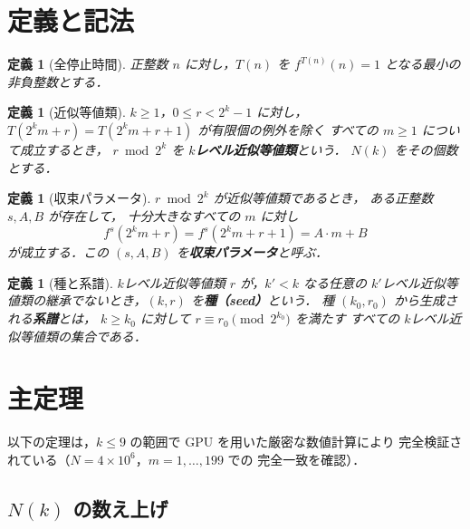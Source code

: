 \documentclass[twocolumn,a4paper,10pt]{jsarticle}
\newtheorem{definition}[theorem]{定義}
\begin{document}
\section{定義と記法}

\begin{definition}[全停止時間]
正整数 $n$ に対し，$T(n)$ を $f^{T(n)}(n) = 1$ となる最小の非負整数とする．
\end{definition}

\begin{definition}[近似等値類]
$k \geq 1$，$0 \leq r < 2^k - 1$ に対し，
$T(2^k m + r) = T(2^k m + r + 1)$ が有限個の例外を除く
すべての $m \geq 1$ について成立するとき，
$r \bmod 2^k$ を \textbf{$k$レベル近似等値類}という．
$N(k)$ をその個数とする．
\end{definition}

\begin{definition}[収束パラメータ]
$r \bmod 2^k$ が近似等値類であるとき，
ある正整数 $s, A, B$ が存在して，
十分大きなすべての $m$ に対し
\[
  f^s(2^k m + r) = f^s(2^k m + r + 1) = A \cdot m + B
\]
が成立する．この $(s, A, B)$ を\textbf{収束パラメータ}と呼ぶ．
\end{definition}

\begin{definition}[種と系譜]
$k$レベル近似等値類 $r$ が，$k' < k$ なる任意の
$k'$レベル近似等値類の継承でないとき，$(k, r)$ を\textbf{種（seed）}という．
種 $(k_0, r_0)$ から生成される\textbf{系譜}とは，
$k \geq k_0$ に対して $r \equiv r_0 \pmod{2^{k_0}}$ を満たす
すべての $k$レベル近似等値類の集合である．
\end{definition}

\section{主定理}

以下の定理は，$k \leq 9$ の範囲で GPU を用いた厳密な数値計算により
完全検証されている（$N = 4 \times 10^6$，$m = 1, \ldots, 199$ での
完全一致を確認）．

\subsection{$N(k)$ の数え上げ}
\end{document}
